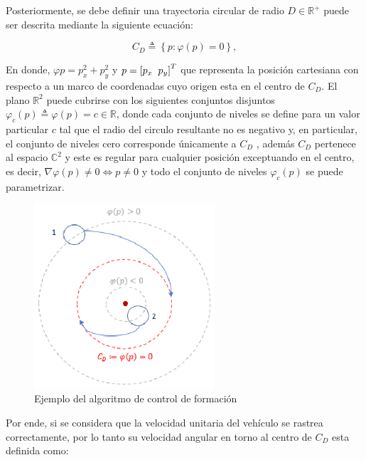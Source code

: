 Posteriormente, se debe definir una trayectoria circular de radio $D\in\mathbb{R}^+$ puede ser descrita mediante la siguiente ecuación:

\begin{equation}
	C_D\triangleq\left\lbrace{p:\varphi{\left(p\right)}=0}\right\rbrace{,}
\end{equation}

En donde, $\varphi{p}=p_{x}^{2}+p_{y}^{2}$ y $p=\left[p_x\hspace{2mm}p_y\right]^T$ que representa la posición cartesiana con respecto a un marco de coordenadas cuyo origen esta en el centro de $C_D$. El plano $\mathbb{R}^2$ puede cubrirse con los siguientes conjuntos disjuntos $\varphi_c\left(p\right)\triangleq\varphi\left(p\right)=c\in\mathbb{R}$, donde cada conjunto de niveles se define para un valor particular $c$ tal que el radio del circulo resultante no es negativo y, en particular, el conjunto de niveles cero corresponde únicamente a $C_D$ \cite{Control_Formacion}, además $C_D$ pertenece al espacio $\mathbb{C}^2$ y este es regular para cualquier posición exceptuando en el centro, es decir, $\nabla{\varphi\left(p\right)}\neq{0}\Longleftrightarrow{p}\neq{0}$ y todo el conjunto de niveles $\varphi_c\left(p\right)$ se puede parametrizar. 
\newpage
\begin{figure}[htb]
\centering
\includegraphics[width=0.60\textwidth]{figures/Pruea_Coordinacion.eps}
\caption{Ejemplo del algoritmo de control de formación} \label{Ejemplo_Coordinacion}
\end{figure}

Por ende, si se considera que la velocidad unitaria del vehículo se rastrea correctamente, por lo tanto su velocidad angular en torno al centro de $C_D$ esta definida como:

